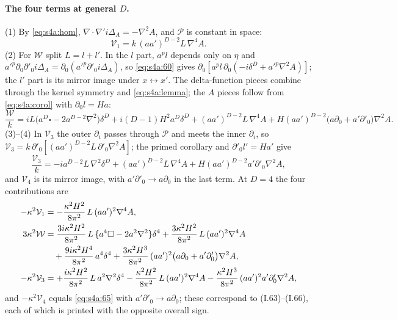 \documentclass[aps,prd,onecolumn,10pt,nofootinbib,floatfix]{revtex4-2}
\newcommand{\eqI}[1]{(I.#1)}
\begin{document}
\paragraph*{The four terms at general $D$.}
(1) By \eqref{eq:s4a:hom}, $\nabla\!\cdot\!\nabla'i\Delta_A=-\nabla^2A$, and $\mathcal P$ is constant in space:
\begin{equation}
\mathcal V_1=k\,(aa')^{D-2}L\,\nabla^4A .
\label{eq:s4a:V1}
\end{equation}
(2) For $\mathcal W$ split $L=l+l'$. In the $l$ part, $a^pl$ depends only on $\eta$ and
$a'^p\partial_0\partial'_0i\Delta_A=\partial_0(a'^p\partial'_0i\Delta_A)$, so \eqref{eq:s4a:60} gives
$\partial_0[a^pl\,\partial_0(-i\delta^D+a'^p\nabla^2A)]$; the $l'$ part is its mirror image under
$x\leftrightarrow x'$. The delta-function pieces combine through the kernel symmetry and
\eqref{eq:s4a:lemma}; the $A$ pieces follow from \eqref{eq:s4a:corol} with $\partial_0l=Ha$:
\begin{equation}
\frac{\mathcal W}{k}=iL\big(a^D\square-2a^{D-2}\nabla^2\big)\delta^D+i(D-1)H^2a^D\delta^D
+(aa')^{D-2}L\,\nabla^4A+H(aa')^{D-2}\big(a\partial_0+a'\partial'_0\big)\nabla^2A .
\label{eq:s4a:W}
\end{equation}
(3)--(4) In $\mathcal V_3$ the outer $\partial_i$ passes through $\mathcal P$ and meets the inner $\partial_i$, so
$\mathcal V_3=k\,\partial'_0[(aa')^{D-2}L\,\partial'_0\nabla^2A]$; the primed corollary and
$\partial'_0l'=Ha'$ give
\begin{equation}
\frac{\mathcal V_3}{k}=-ia^{D-2}L\,\nabla^2\delta^D+(aa')^{D-2}L\,\nabla^4A+H(aa')^{D-2}a'\partial'_0\nabla^2A,
\label{eq:s4a:V3}
\end{equation}
and $\mathcal V_4$ is its mirror image, with $a'\partial'_0\to a\partial_0$ in the last term.
At $D=4$ the four contributions are
\begin{align}
-\kappa^2\mathcal V_1&=-\frac{\kappa^2H^2}{8\pi^2}\,L\,(aa')^2\nabla^4A,
\label{eq:s4a:63}\\
3\kappa^2\mathcal W&=\frac{3i\kappa^2H^2}{8\pi^2}\,L\,\{a^4\square-2a^2\nabla^2\}\delta^4+\frac{3\kappa^2H^2}{8\pi^2}\,L\,(aa')^2\nabla^4A
\notag\\
&\quad+\frac{9i\kappa^2H^4}{8\pi^2}\,a^4\delta^4+\frac{3\kappa^2H^3}{8\pi^2}\,(aa')^2\big(a\partial_0+a'\partial'_0\big)\nabla^2A,
\label{eq:s4a:64}\\
-\kappa^2\mathcal V_3&=+\frac{i\kappa^2H^2}{8\pi^2}\,L\,a^2\nabla^2\delta^4-\frac{\kappa^2H^2}{8\pi^2}\,L\,(aa')^2\nabla^4A
-\frac{\kappa^2H^3}{8\pi^2}\,(aa')^2a'\partial'_0\nabla^2A,
\label{eq:s4a:65}
\end{align}
and $-\kappa^2\mathcal V_4$ equals \eqref{eq:s4a:65} with $a'\partial'_0\to a\partial_0$; these correspond to
\eqI{63}--\eqI{66}, each of which is printed with the opposite overall sign.
\end{document}
